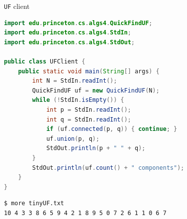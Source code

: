 \documentclass[8pt,a4paper,compress]{beamer}
\begin{document}
\begin{frame}[fragile]
\begin{minipage}{250pt}

\pause
\smallskip

\lstinline{UF} client
\begin{lstlisting}[language=Java]
import edu.princeton.cs.algs4.QuickFindUF;
import edu.princeton.cs.algs4.StdIn;
import edu.princeton.cs.algs4.StdOut;

public class UFClient {
    public static void main(String[] args) {
        int N = StdIn.readInt();
        QuickFindUF uf = new QuickFindUF(N);
        while (!StdIn.isEmpty()) {
            int p = StdIn.readInt();
            int q = StdIn.readInt();
            if (uf.connected(p, q)) { continue; }
            uf.union(p, q);
            StdOut.println(p + " " + q);
        }
        StdOut.println(uf.count() + " components");
    }
}
\end{lstlisting}
    
\pause

\begin{lstlisting}[language={}]
$ more tinyUF.txt
10 4 3 3 8 6 5 9 4 2 1 8 9 5 0 7 2 6 1 1 0 6 7
\end{lstlisting}    

\pause


\end{minipage}
\end{frame}
\end{document}
